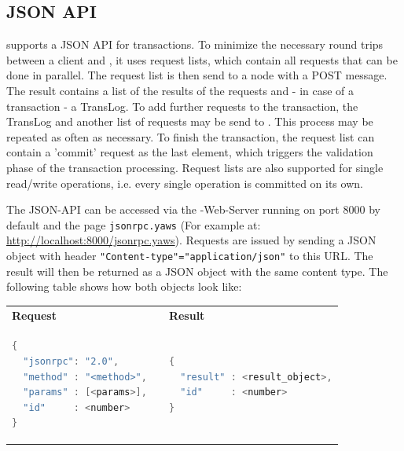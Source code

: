 \documentclass[a4paper]{scrreprt}
\newcommand{\code}[1]{\lstinline[basicstyle=\ttfamily]!#1!}
\begin{document}
\subsection{JSON API}
\label{sec.api.json}

\scalaris{} supports a JSON API for transactions. To minimize the necessary
round trips between a client and \scalaris{}, it uses request lists, which
contain all requests that can be done in parallel. The request list is then
send to a \scalaris{} node with a POST message. The result contains
a list of the results of the requests and - in case of a transaction - a
TransLog. To add further
requests to the transaction, the TransLog and another list of requests may
be send to \scalaris{}. This process may be repeated as often as necessary.
To finish the transaction, the request list can contain a 'commit' request
as the last element, which triggers the validation phase of the transaction
processing.
Request lists are also supported for single read/write operations, i.e.
every single operation is committed on its own. 

The JSON-API can be accessed via the \scalaris{}-Web-Server running on port
8000 by default and the page \code{jsonrpc.yaws} (For example at:
\url{http://localhost:8000/jsonrpc.yaws}).
Requests are issued by sending a JSON object with header
\code{"Content-type"="application/json"} to this URL.
The result will then be returned as a JSON object with the same content type.
The following table shows how both objects look like:

\begin{tabular}{p{}cp{}}
\bf Request & & \bf Result \\
\begin{lstlisting}[language=java]
{
  "jsonrpc": "2.0",
  "method" : "<method>",
  "params" : [<params>],
  "id"     : <number>
}
\end{lstlisting}
& &
\begin{lstlisting}[language=java]
{
  "result" : <result_object>,
  "id"     : <number>
}
\end{lstlisting}
\end{tabular}
\end{document}
